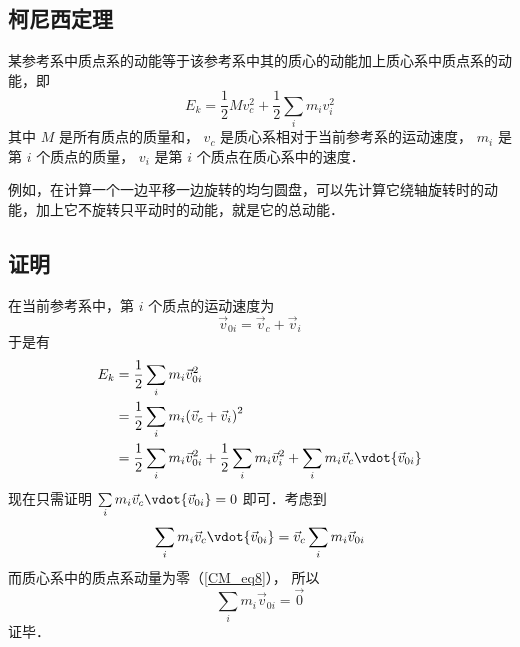 

\subsection{柯尼西定理}
某参考系中质点系的动能等于该参考系中其的质心的动能加上质心系中质点系的动能，即
\begin{equation}
{E_k} = \frac{1}{2}Mv_c^2 + \frac{1}{2}\sum\limits_i {{m_i}v_i^2} 
\end{equation} 
其中 $M$ 是所有质点的质量和， $v_c$ 是质心系相对于当前参考系的运动速度， $m_i$ 是第 $i$ 个质点的质量， $v_i$ 是第 $i$ 个质点在质心系中的速度．

例如，在计算一个一边平移一边旋转的均匀圆盘，可以先计算它绕轴旋转时的动能，加上它不旋转只平动时的动能，就是它的总动能．

\subsection{证明}
在当前参考系中，第 $i$ 个质点的运动速度为
\begin{equation}
{\vec v_{0i}} = {\vec v_c} + {\vec v_i}
\end{equation}
于是有
\begin{equation}\begin{split}
{E_k} &= \frac{1}{2}\sum\limits_i {{m_i}\vec v_{0i}^2} \\
      &= \frac{1}{2}\sum\limits_i {{m_i}{{\left( {{{\vec v}_c} + {{\vec v}_i}} \right)}^2}} \\
 &= \frac{1}{2}\sum\limits_i {{m_i}\vec v_{0i}^2}  + \frac{1}{2}\sum\limits_i {{m_i}\vec v_i^2}  + \sum\limits_i {{m_i}{{\vec v}_c} \vdot {{\vec v}_{0i}}} 
\end{split}\end{equation}
现在只需证明 $\sum\limits_i {{m_i}{{\vec v}_c} \vdot {{\vec v}_{0i}}}  = 0$ 即可．考虑到
\begin{equation}
\sum\limits_i {{m_i}{{\vec v}_c} \vdot {{\vec v}_{0i}}}  = {\vec v_c}\sum\limits_i {{m_i}{{\vec v}_{0i}}}
\end{equation}
而质心系中的质点系动量为零（\autoref{CM_eq8}）， 所以
\begin{equation}
\sum\limits_i {{m_i}{{\vec v}_{0i}}}  = \vec 0
\end{equation}
证毕．


